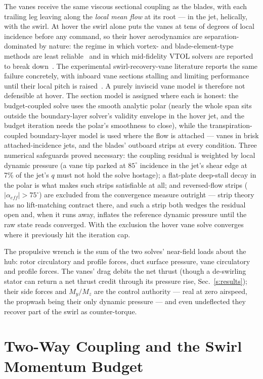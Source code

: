 \documentclass[]{aiaa-tc}%
\begin{document}
The vanes receive the same viscous sectional coupling as the blades,
with each trailing leg leaving along the \emph{local mean flow} at its
root --- in the jet, helically, with the swirl. At hover the swirl
alone puts the vanes at tens of degrees of local incidence before any
command, so their hover aerodynamics are separation-dominated by
nature: the regime in which vortex- and blade-element-type methods
are least reliable~\cite{lee2022} and in which mid-fidelity VTOL
solvers are reported to break down~\cite{tugnoli2021}. The
experimental swirl-recovery-vane literature reports the same failure
concretely, with inboard vane sections stalling and limiting
performance until their local pitch is
raised~\cite{sinnige2018}. A purely inviscid vane model is therefore
not defensible at hover. The section model is assigned where each is honest: the
budget-coupled solve uses the smooth analytic polar (nearly the whole
span sits outside the boundary-layer solver's validity envelope in the
hover jet, and the budget iteration needs the polar's smoothness to
close), while the transpiration-coupled boundary-layer model is used
where the flow is attached --- vanes in brisk attached-incidence jets,
and the blades' outboard strips at every condition. Three numerical
safeguards proved necessary: the coupling residual is weighted by
local dynamic pressure (a vane tip parked at $85^\circ$ incidence in
the jet's shear edge at 7\% of the jet's $q$ must not hold the solve
hostage); a flat-plate deep-stall decay in the polar is what makes
such strips satisfiable at all; and reversed-flow strips
($|\alpha_{eff}| > 75^\circ$) are excluded from the convergence
measure outright --- strip theory has no lift-matching contract there,
and such a strip both wedges the residual open and, when it runs away,
inflates the reference dynamic pressure until the raw state reads
converged. With the exclusion the hover vane solve converges where it
previously hit the iteration cap.

The propulsive wrench is the sum of the two solves' near-field loads
about the hub: rotor circulatory and profile forces, duct surface
pressure, vane circulatory and profile forces. The vanes' drag debits
the net thrust (though a de-swirling stator can return a net thrust
credit through its pressure rise, Sec.~\ref{s:results}); their side
forces and $M_y/M_z$ are the control
authority --- real at zero airspeed, the propwash being their only
dynamic pressure --- and even undeflected they recover part of the
swirl as counter-torque.

\section{Two-Way Coupling and the Swirl Momentum Budget}
\label{s:coupling}
\end{document}
